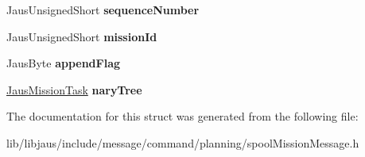 \begin{DoxyCompactItemize}
\item 
\hypertarget{struct_spool_mission_message_struct_a2028a6cff3ed94e90a71a96f71a3e1ac}{\-Jaus\-Unsigned\-Short {\bfseries sequence\-Number}}\label{struct_spool_mission_message_struct_a2028a6cff3ed94e90a71a96f71a3e1ac}

\item 
\hypertarget{struct_spool_mission_message_struct_a732a92fcbc190cc814e99a3e94153722}{\-Jaus\-Unsigned\-Short {\bfseries mission\-Id}}\label{struct_spool_mission_message_struct_a732a92fcbc190cc814e99a3e94153722}

\item 
\hypertarget{struct_spool_mission_message_struct_a4c0b92bf66b50a09b3c2c969c4d1e4fc}{\-Jaus\-Byte {\bfseries append\-Flag}}\label{struct_spool_mission_message_struct_a4c0b92bf66b50a09b3c2c969c4d1e4fc}

\item 
\hypertarget{struct_spool_mission_message_struct_a8540804e38951e75ffccfcfe19547be2}{\hyperlink{struct_jaus_mission_task_struct}{\-Jaus\-Mission\-Task} {\bfseries nary\-Tree}}\label{struct_spool_mission_message_struct_a8540804e38951e75ffccfcfe19547be2}

\end{DoxyCompactItemize}


\-The documentation for this struct was generated from the following file\-:\begin{DoxyCompactItemize}
\item 
lib/libjaus/include/message/command/planning/spool\-Mission\-Message.\-h\end{DoxyCompactItemize}

